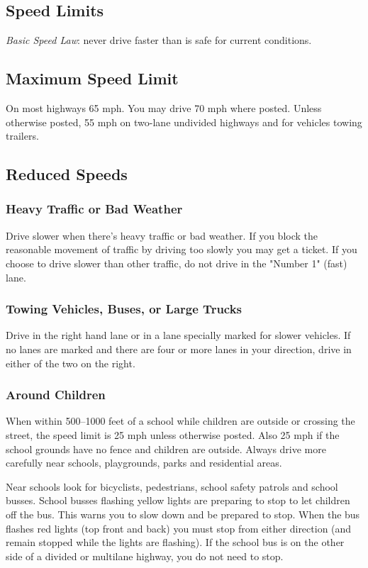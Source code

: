 \subsection{Speed Limits}

\emph{Basic Speed Law}: never drive faster than is safe for current conditions.

\subsection{Maximum Speed Limit}

On most highways 65 mph. You may drive 70 mph where posted.
Unless otherwise posted, 55 mph on two-lane undivided highways
and for vehicles towing trailers.

\subsection{Reduced Speeds}

\subsubsection{Heavy Traffic or Bad Weather}
Drive slower when there's heavy traffic or bad weather.
If you block the reasonable movement of traffic by driving too slowly
you may get a ticket.
If you choose to drive slower than other traffic,
do not drive in the "Number 1" (fast) lane.

\subsubsection{Towing Vehicles, Buses, or Large Trucks}
Drive in the right hand lane or in a lane specially marked for slower vehicles.
If no lanes are marked and there are four or more lanes in your direction,
drive in either of the two on the right.

\subsubsection{Around Children}
When within 500–1000 feet of a school
while children are outside or crossing the street,
the speed limit is 25 mph unless otherwise posted.
Also 25 mph if the school grounds have no fence and children are outside.
Always drive more carefully near
schools, playgrounds, parks and residential areas.

Near schools look for
bicyclists, pedestrians, school safety patrols and school busses.
School busses flashing yellow lights
are preparing to stop to let children off the bus.
This warns you to slow down and be prepared to stop.
When the bus flashes red lights (top front and back)
you must stop from either direction
(and remain stopped while the lights are flashing).
If the school bus is on the other side of a divided or multilane highway,
you do not need to stop.

